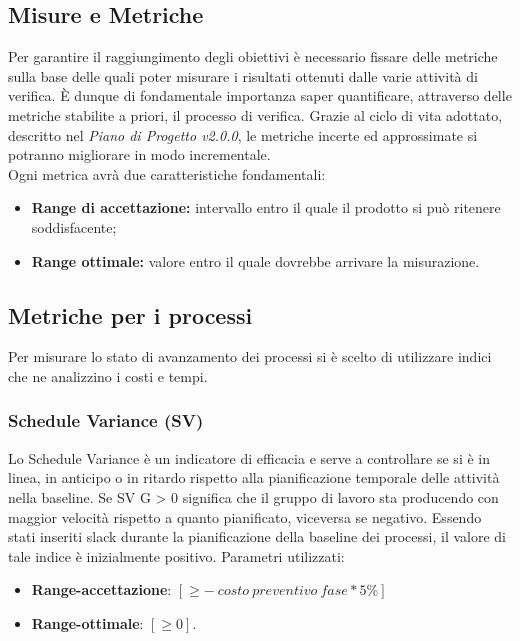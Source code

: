 \subsection{Misure e Metriche}
\label{sezione 3.6}
Per garantire il raggiungimento degli obiettivi è necessario fissare delle metriche sulla base delle quali poter misurare i risultati ottenuti dalle varie attività di verifica. È dunque di fondamentale importanza saper quantificare, attraverso delle metriche stabilite a priori, il processo di verifica. Grazie al ciclo di vita adottato, descritto nel \textit{Piano di Progetto v2.0.0}, le metriche incerte ed approssimate si potranno migliorare in modo incrementale.\\
Ogni metrica avrà due caratteristiche fondamentali:
\begin{itemize}
	\item \textbf{Range di accettazione:} intervallo entro il quale il prodotto si può ritenere soddisfacente;
	\item \textbf{Range ottimale:} valore entro il quale dovrebbe arrivare la misurazione.
\end{itemize}


\subsection{Metriche per i processi}
\label{sezione 3.7}
Per misurare lo stato di avanzamento dei processi si è scelto di utilizzare indici che ne analizzino i costi e
tempi.
\subsubsection{Schedule Variance (SV)}
Lo Schedule Variance è un indicatore di efficacia e serve a controllare se si è in linea, in anticipo o in ritardo rispetto alla pianificazione temporale delle attività nella baseline.
Se SV G > 0 significa che il gruppo di lavoro sta producendo con maggior velocità rispetto a quanto pianificato, viceversa se negativo.
Essendo stati inseriti slack durante la pianificazione della baseline dei processi, il valore di tale indice è inizialmente positivo.
Parametri utilizzati:
\begin{itemize}
	\item \textbf{Range-accettazione}: $\left[  \geq - \: costo \: preventivo \: fase * 5 \% \right]$
	\item \textbf{Range-ottimale}: $\left[\geq 0\right]$.
\end{itemize}
